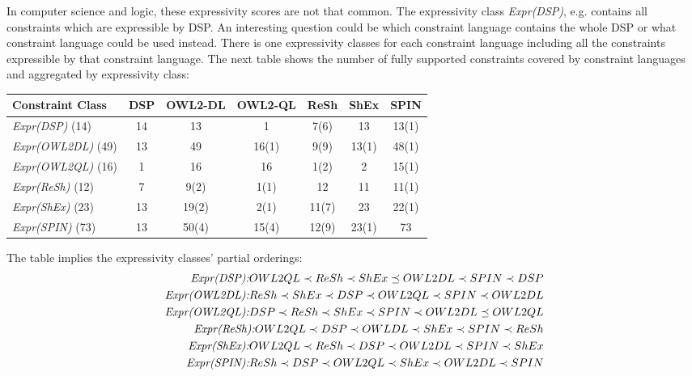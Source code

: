 \documentclass{llncs}
\newenvironment{evaluation}{
  \begin{tabular}{l|c|c|c|c|c|c}
  \hline
  \textbf{Constraint Class} & \textbf{DSP} & \textbf{OWL2-DL} & \textbf{OWL2-QL} & \textbf{ReSh} & \textbf{ShEx} & \textbf{SPIN} \\
  \hline

}{
  \hline
  \end{tabular}
  \linebreak
}
\begin{document}
In computer science and logic, these expressivity scores are not that common.
The expressivity class \emph{Expr(DSP)}, e.g. contains all constraints which are expressible by DSP.
An interesting question could be which constraint language contains the whole DSP or what constraint language could be used instead. 
There is one expressivity classes for each constraint language including all the constraints expressible by that constraint language.
The next table shows the number of fully supported constraints covered by constraint languages and aggregated by expressivity class:
\begin{center}
\begin{evaluation}
\emph{Expr(DSP)} (14) & 14 & 13 & 1 & 7(6) & 13 & 13(1) \\
\emph{Expr(OWL2DL)} (49) & 13 & 49 & 16(1) & 9(9) & 13(1) & 48(1) \\
\emph{Expr(OWL2QL)} (16) & 1 & 16 & 16 & 1(2) & 2 & 15(1) \\
\emph{Expr(ReSh)} (12) & 7 & 9(2) & 1(1) & 12 & 11 & 11(1) \\
\emph{Expr(ShEx)} (23) & 13 & 19(2) & 2(1) & 11(7) & 23 & 22(1) \\
\emph{Expr(SPIN)} (73) & 13 & 50(4) & 15(4) & 12(9) & 23(1) & 73 \\
\end{evaluation}
\end{center}
The table implies the expressivity classes' partial orderings:
\begin{eqnarray*} 
\emph{Expr(DSP):} OWL2QL \prec ReSh \prec ShEx \preceq OWL2DL \prec SPIN \prec DSP \\
\emph{Expr(OWL2DL):} ReSh \prec ShEx \prec DSP \prec OWL2QL \prec SPIN \prec OWL2DL \\
\emph{Expr(OWL2QL):} DSP \prec ReSh \prec ShEx \prec SPIN \prec OWL2DL \preceq OWL2QL \\
\emph{Expr(ReSh):} OWL2QL \prec DSP \prec OWLDL \prec ShEx \prec SPIN \prec ReSh \\
\emph{Expr(ShEx):} OWL2QL \prec ReSh \prec DSP \prec OWL2DL \prec SPIN \prec ShEx \\
\emph{Expr(SPIN):} ReSh \prec DSP \prec OWL2QL \prec ShEx \prec OWL2DL \prec SPIN
\end{eqnarray*}
\end{document}
